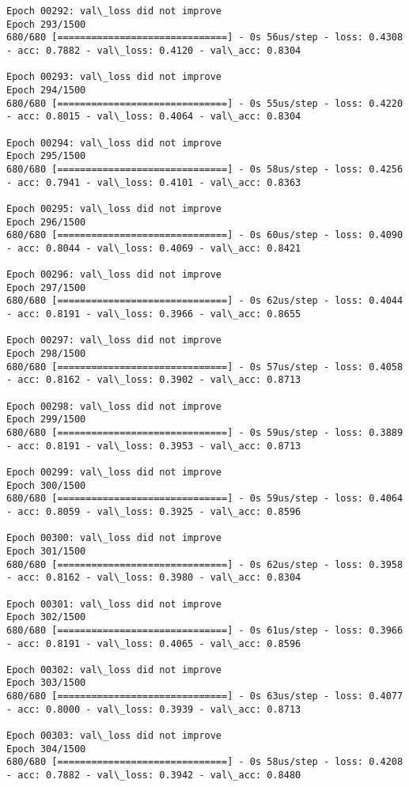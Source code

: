 \documentclass[11pt]{article}
\begin{document}
\begin{Verbatim}[commandchars=\\\{\}]
Epoch 00292: val\_loss did not improve
Epoch 293/1500
680/680 [==============================] - 0s 56us/step - loss: 0.4308 - acc: 0.7882 - val\_loss: 0.4120 - val\_acc: 0.8304

Epoch 00293: val\_loss did not improve
Epoch 294/1500
680/680 [==============================] - 0s 55us/step - loss: 0.4220 - acc: 0.8015 - val\_loss: 0.4064 - val\_acc: 0.8304

Epoch 00294: val\_loss did not improve
Epoch 295/1500
680/680 [==============================] - 0s 58us/step - loss: 0.4256 - acc: 0.7941 - val\_loss: 0.4101 - val\_acc: 0.8363

Epoch 00295: val\_loss did not improve
Epoch 296/1500
680/680 [==============================] - 0s 60us/step - loss: 0.4090 - acc: 0.8044 - val\_loss: 0.4069 - val\_acc: 0.8421

Epoch 00296: val\_loss did not improve
Epoch 297/1500
680/680 [==============================] - 0s 62us/step - loss: 0.4044 - acc: 0.8191 - val\_loss: 0.3966 - val\_acc: 0.8655

Epoch 00297: val\_loss did not improve
Epoch 298/1500
680/680 [==============================] - 0s 57us/step - loss: 0.4058 - acc: 0.8162 - val\_loss: 0.3902 - val\_acc: 0.8713

Epoch 00298: val\_loss did not improve
Epoch 299/1500
680/680 [==============================] - 0s 59us/step - loss: 0.3889 - acc: 0.8191 - val\_loss: 0.3953 - val\_acc: 0.8713

Epoch 00299: val\_loss did not improve
Epoch 300/1500
680/680 [==============================] - 0s 59us/step - loss: 0.4064 - acc: 0.8059 - val\_loss: 0.3925 - val\_acc: 0.8596

Epoch 00300: val\_loss did not improve
Epoch 301/1500
680/680 [==============================] - 0s 62us/step - loss: 0.3958 - acc: 0.8162 - val\_loss: 0.3980 - val\_acc: 0.8304

Epoch 00301: val\_loss did not improve
Epoch 302/1500
680/680 [==============================] - 0s 61us/step - loss: 0.3966 - acc: 0.8191 - val\_loss: 0.4065 - val\_acc: 0.8596

Epoch 00302: val\_loss did not improve
Epoch 303/1500
680/680 [==============================] - 0s 63us/step - loss: 0.4077 - acc: 0.8000 - val\_loss: 0.3939 - val\_acc: 0.8713

Epoch 00303: val\_loss did not improve
Epoch 304/1500
680/680 [==============================] - 0s 58us/step - loss: 0.4208 - acc: 0.7882 - val\_loss: 0.3942 - val\_acc: 0.8480


\end{Verbatim}
\end{document}

